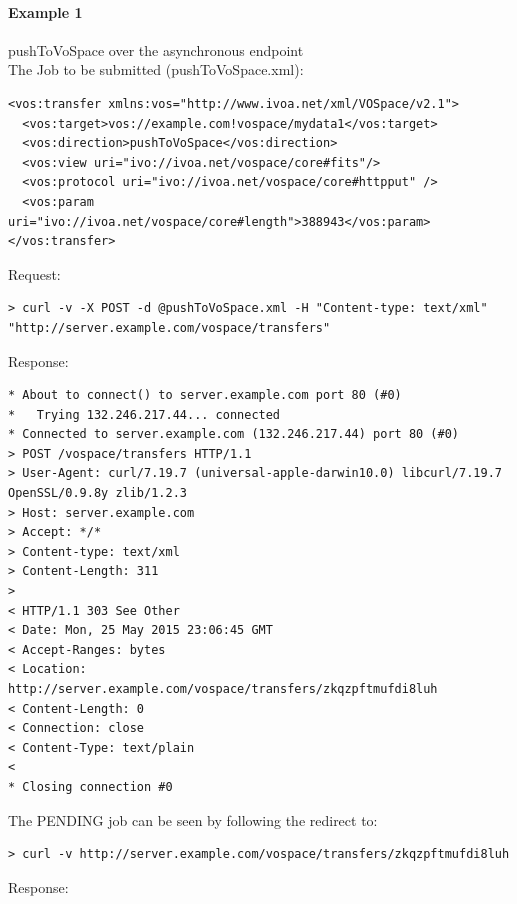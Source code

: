 \documentclass[11pt,a4paper]{ivoa}
\begin{document}
\paragraph{Example 1}
pushToVoSpace over the asynchronous endpoint
\\[5px]
\noindent
The Job to be submitted (pushToVoSpace.xml):
\begin{lstlisting}
<vos:transfer xmlns:vos="http://www.ivoa.net/xml/VOSpace/v2.1">
  <vos:target>vos://example.com!vospace/mydata1</vos:target>
  <vos:direction>pushToVoSpace</vos:direction>
  <vos:view uri="ivo://ivoa.net/vospace/core#fits"/>
  <vos:protocol uri="ivo://ivoa.net/vospace/core#httpput" />
  <vos:param uri="ivo://ivoa.net/vospace/core#length">388943</vos:param>
</vos:transfer>
\end{lstlisting}
Request:
\begin{lstlisting}
> curl -v -X POST -d @pushToVoSpace.xml -H "Content-type: text/xml" "http://server.example.com/vospace/transfers"
\end{lstlisting}
Response:
\begin{lstlisting}
* About to connect() to server.example.com port 80 (#0)
*   Trying 132.246.217.44... connected
* Connected to server.example.com (132.246.217.44) port 80 (#0)
> POST /vospace/transfers HTTP/1.1
> User-Agent: curl/7.19.7 (universal-apple-darwin10.0) libcurl/7.19.7 OpenSSL/0.9.8y zlib/1.2.3
> Host: server.example.com
> Accept: */*
> Content-type: text/xml
> Content-Length: 311
>
< HTTP/1.1 303 See Other
< Date: Mon, 25 May 2015 23:06:45 GMT
< Accept-Ranges: bytes
< Location: http://server.example.com/vospace/transfers/zkqzpftmufdi8luh
< Content-Length: 0
< Connection: close
< Content-Type: text/plain
<
* Closing connection #0
\end{lstlisting}
The PENDING job can be seen by following the redirect to:
\begin{lstlisting}
> curl -v http://server.example.com/vospace/transfers/zkqzpftmufdi8luh
\end{lstlisting}
Response:
\end{document}
